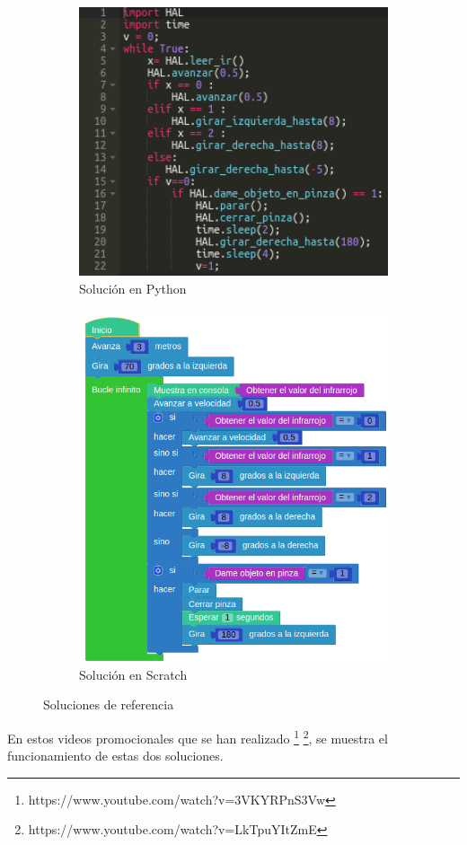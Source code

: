 \begin{figure}[H]
  \begin{subfigure}[b]{0.5\textwidth}
  \centering
    \includegraphics[width=1\textwidth]{chapters/images/solucionppython.png}
    \caption{Solución en Python}
    \label{fig:f1}
  \end{subfigure}
  \hfill
  \begin{subfigure}[b]{0.5\textwidth}
  \centering
    \includegraphics[width=1\textwidth]{chapters/images/solucionpscratch.png}
	\caption{Solución en Scratch}    
    \label{fig:f2}
 
  \end{subfigure}
  \caption{Soluciones de referencia}
\end{figure}

En estos videos promocionales que se han realizado \footnote{https://www.youtube.com/watch?v=3VKYRPnS3Vw} \footnote{https://www.youtube.com/watch?v=LkTpuYItZmE}, se muestra el funcionamiento de estas dos soluciones.